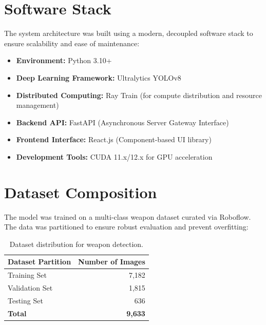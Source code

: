 \documentclass[12pt, a4paper]{report}
\begin{document}
\section{Software Stack}
The system architecture was built using a modern, decoupled software stack to ensure scalability and ease of maintenance:
\begin{itemize}
    \item \textbf{Environment:} Python 3.10+
    \item \textbf{Deep Learning Framework:} Ultralytics YOLOv8
    \item \textbf{Distributed Computing:} Ray Train (for compute distribution and resource management)
    \item \textbf{Backend API:} FastAPI (Asynchronous Server Gateway Interface)
    \item \textbf{Frontend Interface:} React.js (Component-based UI library)
    \item \textbf{Development Tools:} CUDA 11.x/12.x for GPU acceleration
\end{itemize}

\section{Dataset Composition}
The model was trained on a multi-class weapon dataset curated via Roboflow. The data was partitioned to ensure robust evaluation and prevent overfitting:
\begin{table}[h]
\centering
\begin{tabular}{|l|r|}
\hline
\textbf{Dataset Partition} & \textbf{Number of Images} \\ \hline
Training Set               & 7,182                     \\ \hline
Validation Set             & 1,815                     \\ \hline
Testing Set                & 636                       \\ \hline
\textbf{Total}             & \textbf{9,633}            \\ \hline
\end{tabular}
\caption{Dataset distribution for weapon detection.}
\end{table}
\end{document}
